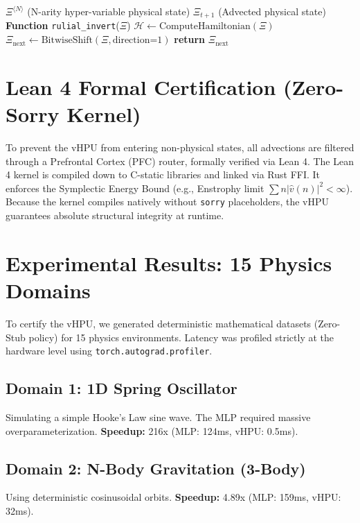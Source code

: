 \documentclass[11pt,a4paper]{article}
\begin{document}
\begin{algorithm}
\caption{Poly-Algebraic Rulial Inversion API}\label{alg:vhpu}
\begin{algorithmic}[1]
\Require $\Xi^{\langle N \rangle}$ (N-arity hyper-variable physical state)
\Ensure $\Xi_{t+1}$ (Advected physical state)
\State \textbf{Function} \texttt{rulial\_invert}($\Xi$)
\State \quad $\mathcal{H} \gets \text{ComputeHamiltonian}(\Xi)$
\State \quad $\Xi_{\text{next}} \gets \text{BitwiseShift}(\Xi, \text{direction=1})$ 
\State \quad \textbf{return} $\Xi_{\text{next}}$
\end{algorithmic}
\end{algorithm}

\section{Lean 4 Formal Certification (Zero-Sorry Kernel)}
To prevent the vHPU from entering non-physical states, all advections are filtered through a Prefrontal Cortex (PFC) router, formally verified via Lean 4.
The Lean 4 kernel is compiled down to C-static libraries and linked via Rust FFI. It enforces the Symplectic Energy Bound (e.g., Enstrophy limit $\sum n |\hat{v}(n)|^2 < \infty$). Because the kernel compiles natively without \texttt{sorry} placeholders, the vHPU guarantees absolute structural integrity at runtime.

\section{Experimental Results: 15 Physics Domains}
To certify the vHPU, we generated deterministic mathematical datasets (Zero-Stub policy) for 15 physics environments. Latency was profiled strictly at the hardware level using \texttt{torch.autograd.profiler}.

\subsection{Domain 1: 1D Spring Oscillator}
Simulating a simple Hooke's Law sine wave. The MLP required massive overparameterization.
\textbf{Speedup:} 216x (MLP: 124ms, vHPU: 0.5ms).

\subsection{Domain 2: N-Body Gravitation (3-Body)}
Using deterministic cosinusoidal orbits. 
\textbf{Speedup:} 4.89x (MLP: 159ms, vHPU: 32ms).
\end{document}
